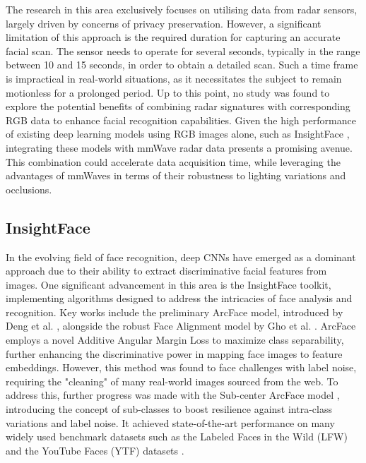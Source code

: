\documentclass{interim}
\begin{document}
The research in this area exclusively focuses on utilising data from radar sensors, largely driven by concerns of privacy preservation. However, a significant limitation of this approach is the required duration for capturing an accurate facial scan. The sensor needs to operate for several seconds, typically in the range between 10 and 15 seconds, in order to obtain a detailed scan. Such a time frame is impractical in real-world situations, as it necessitates the subject to remain motionless for a prolonged period. Up to this point, no study was found to explore the potential benefits of combining radar signatures with corresponding RGB data to enhance facial recognition capabilities. Given the high performance of existing deep learning models using RGB images alone, such as InsightFace \cite{deng2018arcface}, integrating these models with mmWave radar data presents a promising avenue. This combination could accelerate data acquisition time, while leveraging the advantages of mmWaves in terms of their robustness to lighting variations and occlusions.


\subsection{InsightFace}
\label{background:insightface}
In the evolving field of face recognition, deep CNNs have emerged as a dominant approach due to their ability to extract discriminative facial features from images. One significant advancement in this area is the InsightFace toolkit, implementing algorithms designed to address the intricacies of face analysis and recognition. Key works include the preliminary ArcFace model, introduced by Deng et al. \cite{deng2018arcface}, alongside the robust Face Alignment model by Gho et al. \cite{guo2018stacked}. ArcFace employs a novel Additive Angular Margin Loss to maximize class separability, further enhancing the discriminative power in mapping face images to feature embeddings. However, this method was found to face challenges with label noise, requiring the "cleaning" of many real-world images sourced from the web. To address this, further progress was made with the Sub-center ArcFace model \cite{deng2020subcenter}, introducing the concept of sub-classes to boost resilience against intra-class variations and label noise. It achieved state-of-the-art performance on many widely used benchmark datasets such as the Labeled Faces in the Wild (LFW) \cite{huang2008labeled} and the YouTube Faces (YTF) datasets \cite{wolf2011face}.
\end{document}
